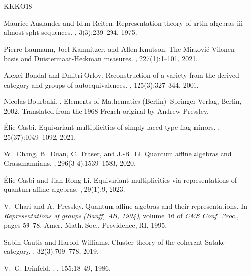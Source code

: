 \documentclass[12pt]{amsart}
\theoremstyle{plain}
\theoremstyle{definition}
\numberwithin{equation}{section}
\begin{document}
\begin{thebibliography}{KKKO18}

Maurice Auslander and Idun Reiten.
\newblock Representation theory of artin algebras iii almost split sequences.
, 3(3):239--294, 1975.

Pierre Baumann, Joel Kamnitzer, and Allen Knutson.
\newblock The {M}irkovi\'c-{V}ilonen basis and {D}uistermaat-{H}eckman measures.
, 227(1):1--101, 2021.

Alexei Bondal and Dmitri Orlov.
\newblock Reconstruction of a variety from the derived category and groups of
  autoequivalences.
, 125(3):327--344, 2001.

Nicolas Bourbaki.
.
\newblock Elements of Mathematics (Berlin). Springer-Verlag, Berlin, 2002.
\newblock Translated from the 1968 French original by Andrew Pressley.

\'Elie Casbi.
\newblock Equivariant multiplicities of simply-laced type flag minors.
, 25(37):1049--1092, 2021.

W.~Chang, B.~Duan, C.~Fraser, and J.-R. Li.
\newblock Quantum affine algebras and {G}rassmannians.
, 296(3-4):1539--1583, 2020.

\'Elie Casbi and Jian-Rong Li.
\newblock Equivariant multiplicities via representations of quantum affine
  algebras.
, 29(1):9, 2023.

V.~Chari and A.~Pressley.
\newblock Quantum affine algebras and their representations.
\newblock In {\em Representations of groups ({B}anff, {AB}, 1994)}, volume~16
  of {\em CMS Conf. Proc.}, pages 59--78. Amer. Math. Soc., Providence, RI,
  1995.

Sabin Cautis and Harold Williams.
\newblock Cluster theory of the coherent {S}atake category.
, 32(3):709--778,
  2019.

V.~G. Drinfeld.
.
, 155:18--49, 1986.


\end{thebibliography}
\end{document}
